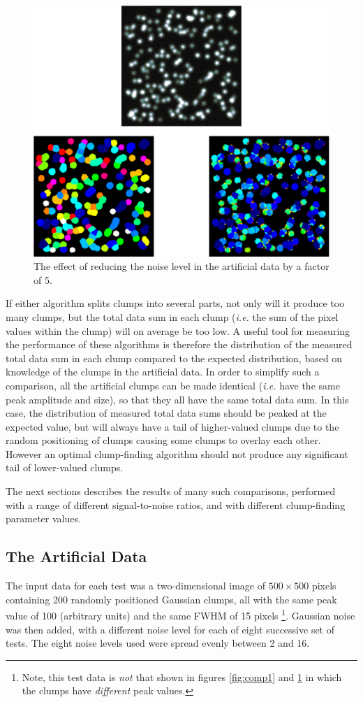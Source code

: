\documentclass[final,authoryear,5p,times,twocolumn]{elsarticle}
\begin{document}
\begin{figure}
\includegraphics[width=\columnwidth]{comp2}
\caption{The effect of reducing the noise level in the artificial data
by a factor of 5.}
\label{fig:comp2}
\end{figure}

If either algorithm splits clumps into several parts, not only will it
produce too many clumps, but the total data sum in each clump (\emph{i.e.}
the sum of the pixel values within the clump) will on
average be too low. A useful tool for measuring the performance of these
algorithms is therefore the distribution of the measured total data sum
in each clump compared to the expected distribution, based on knowledge
of the clumps in the artificial data. In order to simplify such a
comparison, all the artificial clumps can be made identical (\emph{i.e.}
have the same peak amplitude and size), so that they all have the same
total data sum. In this case, the distribution of measured total data
sums should be peaked at the expected value, but will always have a tail
of higher-valued clumps due to the random positioning of clumps causing
some clumps to overlay each other. However an optimal clump-finding
algorithm should not produce any significant tail of lower-valued clumps.

The next sections describes the results of many such comparisons,
performed with a range of different signal-to-noise ratios, and with
different clump-finding parameter values.

\subsection{The Artificial Data}
The input data for each test was a two-dimensional image of $500\times500$
pixels containing 200 randomly positioned Gaussian clumps, all with the
same peak value of 100 (arbitrary units) and the same FWHM of 15 pixels
\footnote{Note, this test data is \emph{not} that shown in figures
\ref{fig:comp1} and \ref{fig:comp2} in which the clumps have \emph{different}
peak values.}. Gaussian noise was then added, with a different noise
level for each of eight successive set of tests. The eight noise levels
used were spread evenly between 2 and 16.
\end{document}
